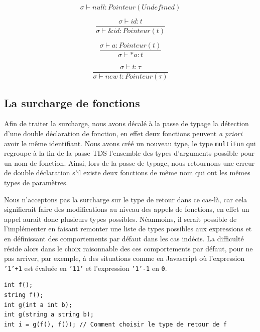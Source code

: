 \documentclass[11pt,a4paper]{article}
\begin{document}
\begin{equation}
	\label{jugNull}
	\sigma \vdash null : Pointeur(Undefined)
\end{equation}

\begin{equation}
	\label{jugAcces}
	\frac{\sigma \vdash id : t}{\sigma \vdash \& id : Pointeur(t)}
\end{equation}

\begin{equation}
	\label{jugValeur}
	\frac{\sigma \vdash a : Pointeur(t)}{\sigma \vdash *a : t}
\end{equation}

\begin{equation}
	\label{jugNew}
	\frac{\sigma \vdash t : \tau}{\sigma \vdash new \  t : Pointeur(\tau)}
\end{equation}

\subsection{La surcharge de fonctions}

Afin de traiter la surcharge, nous avons décalé à la passe de typage la détection d'une double déclaration de fonction, en effet deux fonctions peuvent \emph{a priori} avoir le même identifiant. Nous avons créé un nouveau type, le type \texttt{multiFun} qui regroupe à la fin de la passe TDS l'ensemble des types d'arguments possible pour un nom de fonction. Ainsi, lors de la passe de typage, nous retournons une erreur de double déclaration s’il existe deux fonctions de même nom qui ont les mêmes types de paramètres. 

Nous n'acceptons pas la surcharge sur le type de retour dans ce cas-là, car cela signifierait faire des modifications au niveau des appels de fonctions, en effet un appel aurait donc plusieurs types possibles. Néanmoins, il serait possible de l'implémenter en faisant remonter une liste de types possibles aux expressions et en définissant des comportements par défaut dans les cas indécis. La difficulté réside alors dans le choix raisonnable des ces comportements par défaut, pour ne pas arriver, par exemple, à des situations comme en Javascript où l'expression \texttt{'1'+1} est évaluée en \texttt{'11'} et l'expression \texttt{'1'-1} en \texttt{0}.

\begin{verbatim}
int f();
string f();
int g(int a int b);
int g(string a string b); 
int i = g(f(), f()); // Comment choisir le type de retour de f
\end{verbatim}
\end{document}
